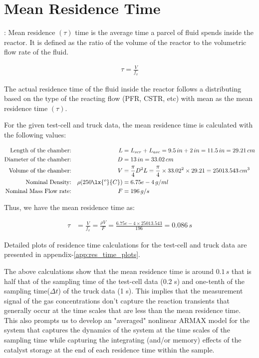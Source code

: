 \section{Mean Residence Time}

: Mean residence $(\tau)$ time is the average time a parcel of
fluid spends inside the reactor. It is defined as the ratio of the volume of
the reactor to the volumetric flow rate of the fluid.

\begin{align}
    \tau = \frac{V}{f_v}
\end{align}

The actual residence time of the fluid inside the reactor follows a distributing
based on the type of the reacting flow (PFR, CSTR, etc) with mean as the mean
residence time $(\tau)$.

For the given test-cell and truck data, the mean residence time is calculated
with the following values:

\begin{align*}
    \text{Length of the chamber:}&&
    L &= L_{scr} + L_{asc} = 9.5 \, in  + 2 \, in = 11.5 \, in = 29.21 \, cm\\
    \text{Diameter of the chamber:} &&
    D &= 13 \, in = 33.02 \, cm\\
    \text{Volume of the chamber:} &&
    V &= \frac{\pi}{4} D^2 L = \frac{\pi}{4} \times 33.02^2 \times 29.21 = 25013.543 \, cm^3\\
    \text{Nominal Density:} &&
    \rho(250 \lx{^o}{C}) &= 6.75e-4 \, g/ml\\
    \text{Nominal Mass Flow rate:} &&
    F &= 196 \, g/s\\
\end{align*}

Thus, we have the mean residence time as:

\begin{align}
    \tau &= \frac{V}{f_v} = \frac{\rho V}{F} = \frac{6.75e-4 \times 25013.543}{196} = 0.086 \, s
\end{align}

Detailed plots of residence time calculations for the test-cell and truck data
are presented in appendix-\ref{app:res_time_plots}.

The above calculations show that the mean residence time is around $0.1 \, s$
that is half that of the sampling time of the test-cell data (0.2 s) and
one-tenth of the sampling time($\Delta t$) of the truck data (1 s). This
implies that the measurement signal of the gas concentrations don't capture the
reaction transients that generally occur at the time scales  that are less than
the mean residence time. This also prompts us to develop an "averaged"
nonlinear ARMAX model for the system that captures the dynamics of the system
at the time scales of the sampling time while capturing the integrating (and/or
memory) effects of the catalyst storage at the end of each residence time
within the sample.

